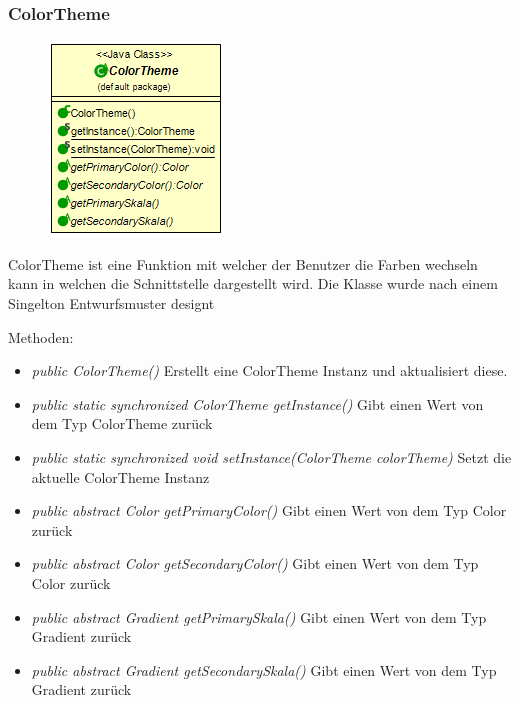 \subsubsection{ColorTheme}
\begin{minipage}{0.3\textwidth}
    \begin{figure}[H]
        {\centering\includegraphics[scale = 0.5
        ]{media/view/theme/ColorTheme_Class.png}}
    \end{figure}
    \end{minipage} \hfill
    \begin{minipage}{0.6\textwidth}
ColorTheme ist eine Funktion mit welcher der Benutzer die Farben wechseln kann in welchen die Schnittstelle dargestellt wird. Die Klasse wurde nach einem Singelton Entwurfsmuster designt
\end{minipage}
\vspace{\baselineskip}
Methoden: \begin{itemize} [noitemsep]
    \item \emph{public ColorTheme()} Erstellt eine ColorTheme Instanz und aktualisiert diese.
    \item \emph{public static synchronized ColorTheme getInstance()} Gibt einen Wert von dem Typ ColorTheme zurück
    \item \emph{public static synchronized void setInstance(ColorTheme colorTheme)} Setzt die aktuelle ColorTheme Instanz
    \item \emph{public abstract Color getPrimaryColor()} Gibt einen Wert von dem Typ Color zurück
    \item \emph{public abstract Color getSecondaryColor()} Gibt einen Wert von dem Typ Color zurück
    \item \emph{public abstract Gradient getPrimarySkala()} Gibt einen Wert von dem Typ Gradient zurück
    \item \emph{public abstract Gradient getSecondarySkala()}  Gibt einen Wert von dem Typ Gradient zurück
\end{itemize}

